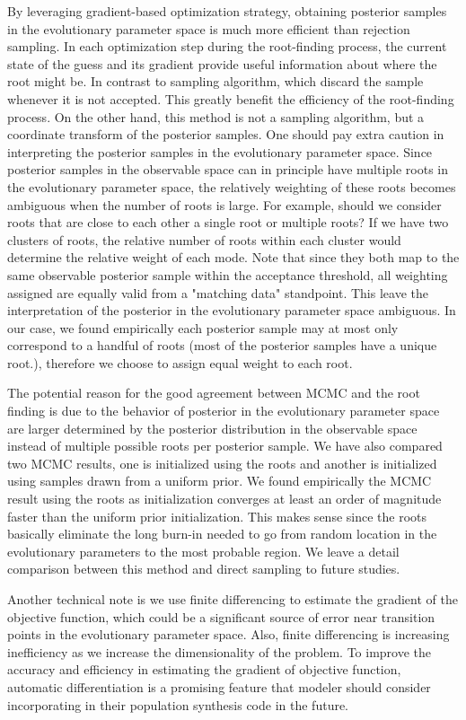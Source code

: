 \documentclass[twocolumn]{aastex631}
\begin{document}
By leveraging gradient-based optimization strategy, obtaining posterior samples in the evolutionary parameter space is much more efficient than rejection sampling.
In each optimization step during the root-finding process, the current state of the guess and its gradient provide useful information about where the root might be.
In contrast to sampling algorithm, which discard the sample whenever it is not accepted.
This greatly benefit the efficiency of the root-finding process.
On the other hand, this method is not a sampling algorithm, but a coordinate transform of the posterior samples.
One should pay extra caution in interpreting the posterior samples in the evolutionary parameter space.
Since posterior samples in the observable space can in principle have multiple roots in the evolutionary parameter space,
the relatively weighting of these roots becomes ambiguous when the number of roots is large.
For example, should we consider roots that are close to each other a single root or multiple roots?
If we have two clusters of roots, the relative number of roots within each cluster would determine the relative weight of each mode.
Note that since they both map to the same observable posterior sample within the acceptance threshold, all weighting assigned are equally valid from a "matching data" standpoint.
This leave the interpretation of the posterior in the evolutionary parameter space ambiguous.
In our case, we found empirically each posterior sample may at most only correspond to a handful of roots (most of the posterior samples have a unique root.), therefore we choose to assign equal weight to each root.

The potential reason for the good agreement between MCMC and the root finding is due to the behavior of posterior in the evolutionary parameter space are larger determined by the posterior distribution in the observable space instead of multiple possible roots per posterior sample.
We have also compared two MCMC results, one is initialized using the roots and another is initialized using samples drawn from a uniform prior.
We found empirically the MCMC result using the roots as initialization converges at least an order of magnitude faster than the uniform prior initialization.
This makes sense since the roots basically eliminate the long burn-in needed to go from random location in the evolutionary parameters to the most probable region.
We leave a detail comparison between this method and direct sampling to future studies.

Another technical note is we use finite differencing to estimate the gradient of the objective function, which could be a significant source of error near transition points in the evolutionary parameter space.
Also, finite differencing is increasing inefficiency as we increase the dimensionality of the problem.
To improve the accuracy and efficiency in estimating the gradient of objective function, automatic differentiation is a promising feature that modeler should consider incorporating in their population synthesis code in the future.
\end{document}

